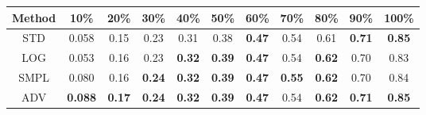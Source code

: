 \documentclass{standalone}
\begin{document}
\begin{tabular}{c|cccccccccc}
      \toprule
      Method & 10\% & 20\% & 30\% & 40\% & 50\% & 60\% & 70\% & 80\% & 90\% & 100\% \\
      \midrule
STD & 0.058 & 0.15 & 0.23 & 0.31 & 0.38 & \textbf{0.47} & 0.54 & 0.61 & \textbf{0.71} & \textbf{0.85}\\
LOG & 0.053 & 0.16 & 0.23 & \textbf{0.32} & \textbf{0.39} & \textbf{0.47} & 0.54 & \textbf{0.62} & 0.70 & 0.83\\
SMPL & 0.080 & 0.16 & \textbf{0.24} & \textbf{0.32} & \textbf{0.39} & \textbf{0.47} & \textbf{0.55} & \textbf{0.62} & 0.70 & 0.84\\
ADV & \textbf{0.088} & \textbf{0.17} & \textbf{0.24} & \textbf{0.32} & \textbf{0.39} & \textbf{0.47} & 0.54 & \textbf{0.62} & \textbf{0.71} & \textbf{0.85}\\
  \bottomrule
\end{tabular}
\end{document}
